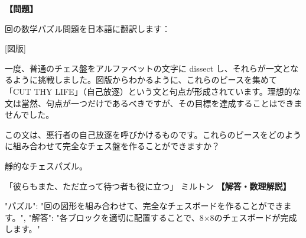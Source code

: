 \documentclass[10pt,a4paper,oneside,openany]{ltjsbook}
\begin{document}
\begin{tcolorbox}[colback=softblue,colframe=primaryblue,title=\textbf{第 294 問：THE CHESSBOARD SENTENCE.},arc=2mm,boxrule=1pt,breakable]
\textbf{【問題】}\par\vspace{0.3em}
回の数学パズル問題を日本語に翻訳します：

[図版]

一度、普通のチェス盤をアルファベットの文字に dissect し、それらが一文となるように挑戦しました。図版からわかるように、これらのピースを集めて「CUT THY LIFE」（自己放逐）という文と句点が形成されています。理想的な文は當然、句点が一つだけであるべきですが、その目標を達成することはできませんでした。

この文は、悪行者の自己放逐を呼びかけるものです。これらのピースをどのように組み合わせて完全なチェス盤を作ることができますか？

靜的なチェスパズル。

「彼らもまた、ただ立って待つ者も役に立つ」
ミルトン
\tcblower
\textbf{【解答・数理解説】}\par\vspace{0.3em}
{
  "パズル": "回の図形を組み合わせて、完全なチェスボードを作ることができます。",
  "解答": "各ブロックを適切に配置することで、8×8のチェスボードが完成します。"
}
\end{tcolorbox}
\end{document}
